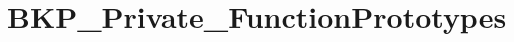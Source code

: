 \hypertarget{group___b_k_p___private___function_prototypes}{}\section{B\+K\+P\+\_\+\+Private\+\_\+\+Function\+Prototypes}
\label{group___b_k_p___private___function_prototypes}
